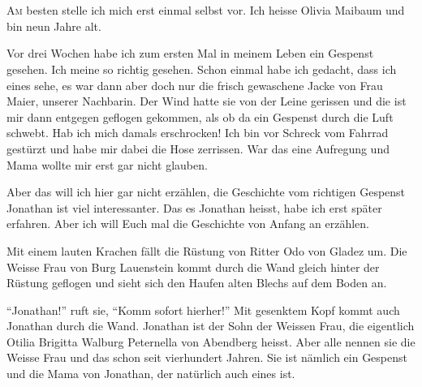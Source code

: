 \chapter*{}
\begin{mdframed}[style=mystyle]
\lettrine[lines=3]{\color{red}A}{m} besten stelle ich mich erst einmal selbst vor. Ich heisse Olivia Maibaum und bin neun Jahre alt. 

Vor drei Wochen habe ich zum ersten Mal in meinem Leben ein Gespenst gesehen. Ich meine so richtig gesehen. Schon einmal habe ich gedacht, dass ich eines sehe, es war dann aber doch nur die frisch gewaschene Jacke von Frau Maier, unserer Nachbarin. Der Wind hatte sie von der Leine gerissen und die ist mir dann entgegen geflogen gekommen, als ob da ein Gespenst durch die Luft schwebt. Hab ich mich damals erschrocken! Ich bin vor Schreck vom Fahrrad gestürzt und habe mir dabei die Hose zerrissen.  War das eine Aufregung und Mama wollte mir erst gar nicht glauben.

Aber das will ich hier gar nicht erzählen, die Geschichte vom richtigen Gespenst Jonathan ist viel interessanter.  Das es Jonathan heisst, habe ich erst später erfahren. Aber ich will Euch mal die Geschichte von Anfang an erzählen.
\end{mdframed}\medskip

Mit einem lauten Krachen fällt die Rüstung von Ritter Odo von Gladez um. Die Weisse Frau von Burg Lauenstein kommt durch die Wand gleich hinter der Rüstung geflogen und sieht sich den Haufen alten Blechs auf dem Boden an.

\enquote{Jonathan!} ruft sie, \enquote{Komm sofort hierher!} Mit gesenktem Kopf kommt auch Jonathan durch die Wand. Jonathan ist der Sohn der Weissen Frau, die eigentlich Otilia Brigitta Walburg Peternella von Abendberg heisst. Aber alle nennen sie die Weisse Frau und das schon seit vierhundert Jahren. Sie ist nämlich ein Gespenst und die Mama von Jonathan, der natürlich auch eines ist. 

